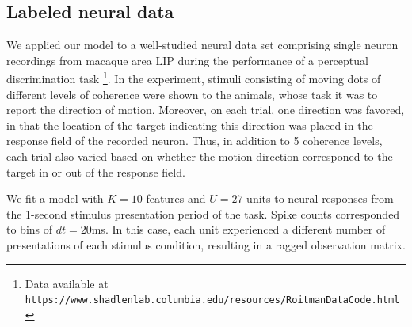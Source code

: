 \documentclass{article} %
\begin{document}
\subsection{Labeled neural data}
We applied our model to a well-studied neural data set comprising single neuron recordings from macaque area LIP during the performance of a perceptual discrimination task \cite{roitman2002response}\footnote{Data available at \texttt{https://www.shadlenlab.columbia.edu/resources/RoitmanDataCode.html}}. In the experiment, stimuli consisting of moving dots of different levels of coherence were shown to the animals, whose task it was to report the direction of motion. Moreover, on each trial, one direction was favored, in that the location of the target indicating this direction was placed in the response field of the recorded neuron. Thus, in addition to 5 coherence levels, each trial also varied based on whether the motion direction corresponed to the target in or out of the response field.

We fit a model with $K = 10$ features and $U = 27$ units to neural responses from the 1-second stimulus presentation period of the task. Spike counts corresponded to bins of $dt = 20$ms. In this case, each unit experienced a different number of presentations of each stimulus condition, resulting in a ragged observation matrix.
\end{document}
